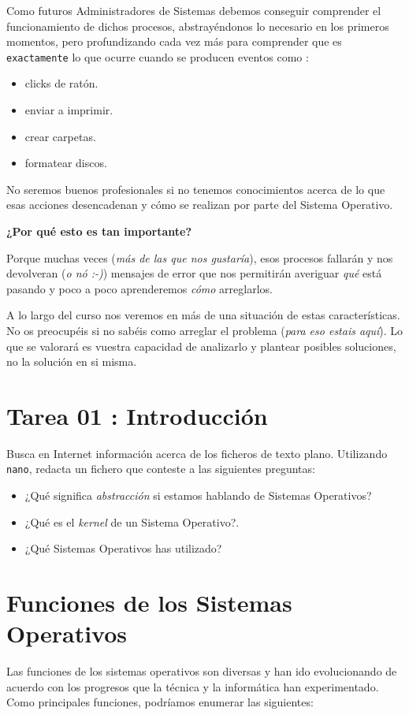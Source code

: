 \documentclass[11pt]{article}
\begin{document}
Como futuros Administradores de Sistemas debemos conseguir comprender el funcionamiento de dichos
procesos, abstrayéndonos lo necesario en los primeros momentos, pero profundizando cada vez más 
para comprender que es \texttt{exactamente} lo que ocurre cuando se producen eventos como :

\begin{itemize}
\item clicks de ratón.
\item enviar a imprimir.
\item crear carpetas.
\item formatear discos.
\end{itemize}

No seremos buenos profesionales si no tenemos conocimientos acerca de lo que esas acciones desencadenan 
y cómo se realizan por parte del Sistema Operativo. 

\textbf{¿Por qué esto es tan importante?}

Porque muchas veces (\emph{más de las que nos gustaría}), esos procesos fallarán y nos devolveran (\emph{o nó :-)})
mensajes de error que nos permitirán averiguar \emph{qué} está pasando y poco a poco aprenderemos \emph{cómo} arreglarlos.

A lo largo del curso nos veremos en más de una situación de estas características. No os preocupéis si no 
sabéis como arreglar el problema (\emph{para eso estais aquí}). Lo que se valorará es vuestra capacidad de analizarlo
y plantear posibles soluciones, no la solución en si misma.

\newpage
\section{Tarea 01 : Introducción}
\label{sec:orge788fa2}

Busca en Internet información acerca de los ficheros de texto plano.
Utilizando \texttt{nano}, redacta un fichero que conteste a las siguientes preguntas:

\begin{itemize}
\item ¿Qué significa \emph{abstracción} si estamos hablando de Sistemas Operativos?
\item ¿Qué es el \emph{kernel} de un Sistema Operativo?.
\item ¿Qué Sistemas Operativos has utilizado?
\end{itemize}


\newpage
\section{Funciones de los Sistemas Operativos}
\label{sec:orgfa6f216}
Las funciones de los sistemas operativos son diversas y han ido
evolucionando de acuerdo con los progresos que la técnica y la
informática han experimentado. Como principales funciones, podríamos
enumerar las siguientes:
\end{document}
